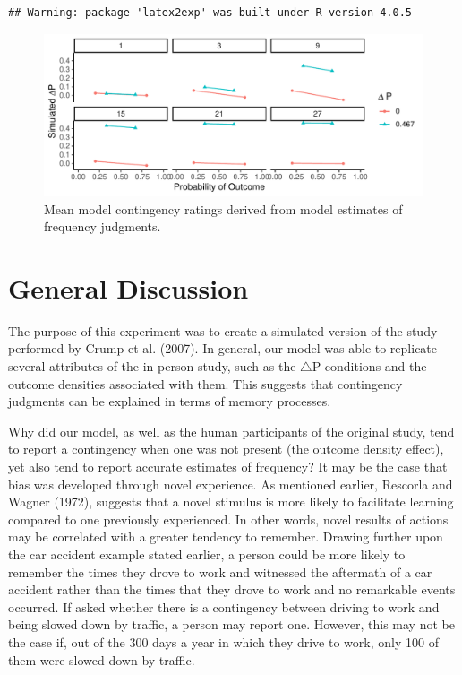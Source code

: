 \documentclass[
  english,
  man,floatsintext]{apa6}
\begin{document}
\begin{verbatim}
## Warning: package 'latex2exp' was built under R version 4.0.5
\end{verbatim}

\begin{figure}

{\centering \includegraphics{Thesis_google_test_files/figure-latex/unnamed-chunk-8-1} 

}

\caption{Mean model contingency ratings derived from model estimates of frequency judgments.}\label{fig:unnamed-chunk-8}
\end{figure}

\hypertarget{general-discussion}{%
\section{General Discussion}\label{general-discussion}}

The purpose of this experiment was to create a simulated version of the study performed by Crump et al. (2007). In general, our model was able to replicate several attributes of the in-person study, such as the \(\triangle\)P conditions and the outcome densities associated with them. This suggests that contingency judgments can be explained in terms of memory processes.

Why did our model, as well as the human participants of the original study, tend to report a contingency when one was not present (the outcome density effect), yet also tend to report accurate estimates of frequency? It may be the case that bias was developed through novel experience. As mentioned earlier, Rescorla and Wagner (1972), suggests that a novel stimulus is more likely to facilitate learning compared to one previously experienced. In other words, novel results of actions may be correlated with a greater tendency to remember. Drawing further upon the car accident example stated earlier, a person could be more likely to remember the times they drove to work and witnessed the aftermath of a car accident rather than the times that they drove to work and no remarkable events occurred. If asked whether there is a contingency between driving to work and being slowed down by traffic, a person may report one. However, this may not be the case if, out of the 300 days a year in which they drive to work, only 100 of them were slowed down by traffic.
\end{document}
